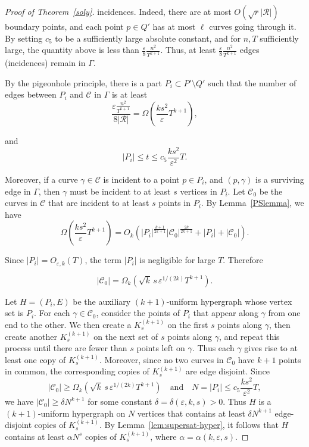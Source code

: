 \documentclass[11pt]{article}
\theoremstyle{plain}
\theoremstyle{definition}
\theoremstyle{remark}
\begin{document}
\begin{proof}[Proof of Theorem~\ref{soly}]
\noindent incidences.  Indeed, there are at most $O(\sqrt{r}|\mathcal R|)$ boundary points, and each point $p \in Q'$ has at most $\ell$ curves going through it.   By setting $c_5$ to be a sufficiently large absolute constant, and for $n,T$ sufficiently large, the quantity above is less than $\frac{\varepsilon}{8} \frac{n^2}{T^{k+1}}$. Thus, at least $\frac{\varepsilon}{8} \frac{n^2}{T^{k+1}}$ edges (incidences) remain in $\Gamma$. 

By the pigeonhole principle, there is a part $P_i \subset P'\setminus Q'$ such that the number of edges between $P_i$ and $\mathcal C$ in $\Gamma$ is at least
\[
\frac{\varepsilon \frac{n^2}{T^{k+1}}}{8|\mathcal R|}
=
\Omega\!\left(
\frac{ks^2}{\varepsilon}
T^{k+1}
\right),
\]

\noindent and
\[
 |P_i|  \leq t \leq  c_5\frac{ks^2}{\varepsilon^2}T.
\]

Moreover, if a curve $\gamma \in \mathcal C$ is incident to a point $p \in P_i$, and $(p,\gamma)$ is a surviving edge in $\Gamma$, then $\gamma$ must be incident to at least $s$ vertices in $P_i$.  Let $\mathcal C_0$ be the curves in $\mathcal C$ that are incident to at least $s$ points in $P_i$. By Lemma~\ref{PSlemma}, we have
\[
\Omega\!\left(
\frac{ks^2}{\varepsilon}
T^{k+1}
\right)  = O_k\left(
|P_i|^{\frac{k + 1}{2k + 1}}
|\mathcal C_0|^{\frac{2k}{2k + 1}}
+|P_i|+|\mathcal  C_0|
\right).
\]

\noindent Since $|P_i|=O_{\varepsilon,k}\!\left(T\right)$, the term $|P_i|$ is negligible for large $T$. Therefore 


\[
|\mathcal C_0|
=
\Omega_k\!\left(
 \sqrt{k}\,s\,\varepsilon^{1/(2k)} 
T^{k+1}
\right).
\]

Let $H=(P_i,E)$ be the auxiliary $(k + 1)$-uniform hypergraph whose vertex set is $P_i$. For each $\gamma \in \mathcal C_0$, consider the points of $P_i$ that appear along $\gamma$ from one end to the other. We then create a $K^{(k+1)}_s$ on the first $s$ points along $\gamma$, then create another $K^{(k+1)}_s$ on the next set of $s$ points along $\gamma$, and repeat this process until there are fewer than $s$ points left on $\gamma$. Thus each $\gamma$ gives rise to at least one copy of $K^{(k+1)}_s$.  Moreover, since no two curves in $\mathcal C_0$ have $k + 1$ points in common, the corresponding copies of $K_s^{(k + 1)}$ are edge disjoint. Since
\[
|\mathcal C_0| \geq \Omega_k\!\left(
 \sqrt{k}\,s\,\varepsilon^{1/(2k)} 
T^{k+1}
\right)
\quad\text{and}\quad
N = |P_i|  \leq c_5\frac{ks^2}{\varepsilon^2}T,
\]
we have $|\mathcal C_0| \geq \delta N^{k + 1}$ for some constant $\delta = \delta(\varepsilon,k,s) > 0$. Thus $H$ is a $(k +1)$-uniform hypergraph on $N$ vertices that contains at least $\delta N^{k + 1}$ edge-disjoint copies of $K^{(k+1)}_s$. By Lemma~\ref{lem:supersat-hyper}, it follows that $H$ contains at least $\alpha N^s$ copies of $K^{(k+1)}_s$, where $\alpha=\alpha(k,\varepsilon,s)$.


\end{proof}
\end{document}
